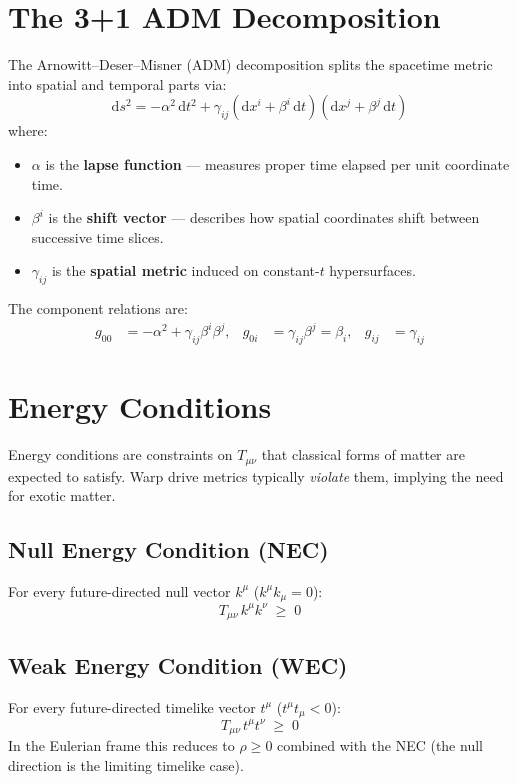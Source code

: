 \documentclass[11pt, a4paper, twoside]{report}
\newcommand{\dd}{\mathrm{d}}
\begin{document}
\section{The 3+1 ADM Decomposition}
\label{sec:adm}

The Arnowitt--Deser--Misner (ADM) decomposition splits the spacetime
metric into spatial and temporal parts via:
\begin{equation}
  \dd s^2
  = -\alpha^2\,\dd t^2
  + \gamma_{ij}\!\left(\dd x^i + \beta^i\,\dd t\right)\!
                     \left(\dd x^j + \beta^j\,\dd t\right)
  \label{eq:adm}
\end{equation}
where:
\begin{itemize}
  \item $\alpha$ is the \textbf{lapse function} — measures proper time
        elapsed per unit coordinate time.
  \item $\beta^i$ is the \textbf{shift vector} — describes how spatial
        coordinates shift between successive time slices.
  \item $\gamma_{ij}$ is the \textbf{spatial metric} induced on constant-$t$
        hypersurfaces.
\end{itemize}

The component relations are:
\begin{align}
  g_{00} &= -\alpha^2 + \gamma_{ij}\beta^i\beta^j, &
  g_{0i} &= \gamma_{ij}\beta^j = \beta_i, &
  g_{ij} &= \gamma_{ij}
  \label{eq:adm_comp}
\end{align}

\section{Energy Conditions}
\label{sec:ec}

Energy conditions are constraints on $T_{\mu\nu}$ that classical forms
of matter are expected to satisfy.  Warp drive metrics typically
\emph{violate} them, implying the need for exotic matter.

\subsection{Null Energy Condition (NEC)}
For every future-directed null vector $k^\mu$ ($k^\mu k_\mu = 0$):
\begin{equation}
  T_{\mu\nu}\,k^\mu k^\nu \;\ge\; 0
  \label{eq:nec}
\end{equation}

\subsection{Weak Energy Condition (WEC)}
For every future-directed timelike vector $t^\mu$ ($t^\mu t_\mu < 0$):
\begin{equation}
  T_{\mu\nu}\,t^\mu t^\nu \;\ge\; 0
  \label{eq:wec}
\end{equation}
In the Eulerian frame this reduces to $\rho \ge 0$ combined with the NEC
(the null direction is the limiting timelike case).
\end{document}
